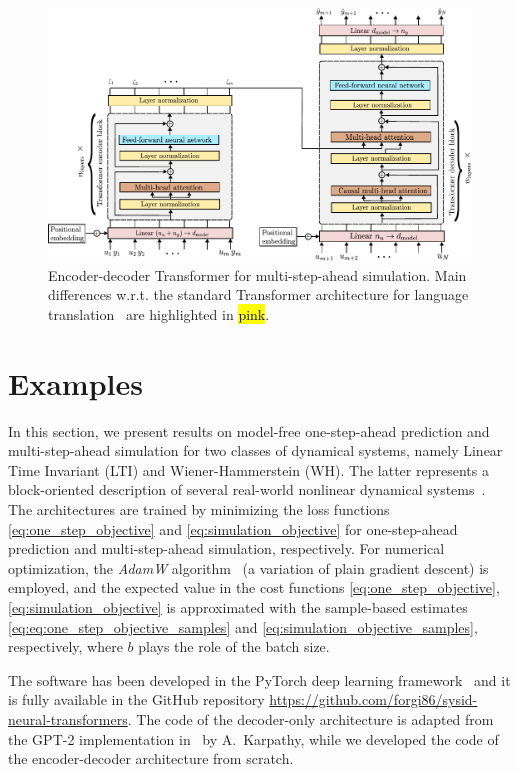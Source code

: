 \documentclass{article}
\begin{document}
\begin{figure}[!bt]
\includegraphics[width=.99\textwidth]{fig/architecture/encoder_decoder_architecture.pdf}
\caption{Encoder-decoder Transformer  for multi-step-ahead simulation. Main differences w.r.t. the standard Transformer architecture for language translation~\cite{vaswani2017attention} are highlighted in \hl{pink}.}
\label{fig:encoder_decoder_arch}
\end{figure}


 

  

\section{Examples}
\label{sec:examples}

In this section, we present results on model-free one-step-ahead prediction and multi-step-ahead simulation for two classes of dynamical systems, namely
Linear Time Invariant (LTI) and Wiener-Hammerstein (WH). The latter represents a block-oriented description of several real-world nonlinear dynamical systems~\cite{giri2010block}.  
The architectures are trained by minimizing the loss functions 
\eqref{eq:one_step_objective} and \eqref{eq:simulation_objective} for one-step-ahead prediction and multi-step-ahead simulation, respectively.
For numerical optimization, the \emph{AdamW} algorithm~\cite{loshchilov2017decoupled} (a variation of plain gradient descent) is employed, and the expected value in the cost functions \eqref{eq:one_step_objective}, \eqref{eq:simulation_objective} is approximated with the sample-based estimates \eqref{eq:eq:one_step_objective_samples} and \eqref{eq:simulation_objective_samples}, respectively, where $b$ plays the role of the batch size.

The software has been developed in the PyTorch deep learning framework~\cite{paszke2019pytorch} and it is fully available in the GitHub repository \url{https://github.com/forgi86/sysid-neural-transformers}. The code of the decoder-only architecture is adapted from the  GPT-2 implementation in~\cite{nanoGPT} by A.~Karpathy, while we developed the code of the encoder-decoder architecture  from scratch.
\end{document}
